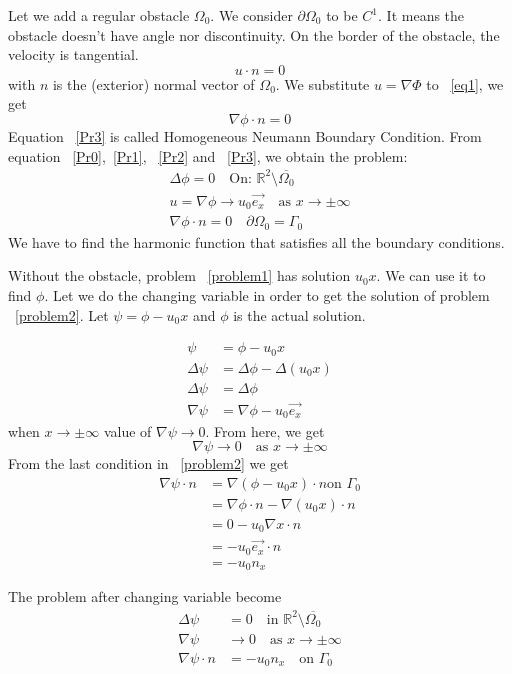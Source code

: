 \documentclass[a4paper,12pt]{article}
\begin{document}
Let we add a regular obstacle $\Omega_0$. We consider $\partial\Omega_0$ to be $C^1$. It means the obstacle doesn't have angle nor discontinuity. 
On the border of the obstacle, the velocity is tangential.
\begin{equation}\label{eq1}
u\cdot n=0
\end{equation}
with $n$ is the (exterior) normal vector of $\Omega_0$.
We substitute $u=\nabla\Phi$ to ~\eqref{eq1}, we get 
\begin{equation}\label{Pr3}
\nabla\phi\cdot n=0
\end{equation}
Equation ~\eqref{Pr3} is called Homogeneous Neumann Boundary Condition.  
From equation ~\eqref{Pr0},~\eqref{Pr1}, ~\eqref{Pr2} and ~\eqref{Pr3}, we obtain the problem:
\begin{equation} \label{problem2}
\begin{split}
\Delta \phi=0 \quad \text{On: } \mathbb{R}^2 \setminus \overline{\Omega_0}\\
u=\nabla\phi\to u_0\vec{e_x}\quad \text{as } x \to \pm\infty\\
\nabla\phi \cdot n=0 \quad \partial \Omega_0=\Gamma_0
\end{split}
\end{equation}
We have to find the harmonic function that satisfies all the boundary conditions.

Without the obstacle, problem ~\eqref{problem1} has solution $u_0x$. We can use it to find $\phi$. Let we do the changing variable in order to get the solution of problem ~\eqref{problem2}.
Let $\psi=\phi-u_0 x$ and $\phi$ is the actual solution. 

\begin{align*}
\psi&=\phi-u_0 x\\
 \Delta \psi &= \Delta \phi-\Delta (u_0x)\\
\Delta \psi &= \Delta \phi\\
\nabla \psi &= \nabla\phi-u_0\vec{e_x}
\end{align*}
when $x\to\pm\infty$ value of $\nabla \psi\to 0$.
From here, we get 
\begin{equation}
 \nabla\psi\to0 \quad \text{as } x\to\pm\infty
\end{equation}
From the last condition in ~\eqref{problem2} we get
\begin{align*}
 \nabla\psi\cdot n &= \nabla(\phi-u_0 x)\cdot n \text{on } \Gamma_0\\
&=\nabla\phi \cdot n - \nabla(u_0 x)\cdot n\\
&=0-u_0\nabla x\cdot n\\
&=-u_0 \vec{e_x} \cdot n\\
&=-u_0 n_x
\end{align*}

The problem after changing variable become
\begin{equation}  \label{problem3}
\begin{split}
\Delta \psi&=0 \quad \text{in } \mathbb{R}^2 \setminus \overline{\Omega_0}\\
\nabla\psi &\to 0 \quad \text{as } x\to\pm\infty\\
\nabla\psi \cdot n &= -u_0 n_x \quad \text{on } \Gamma_0 
\end{split}
\end{equation}
\end{document}
